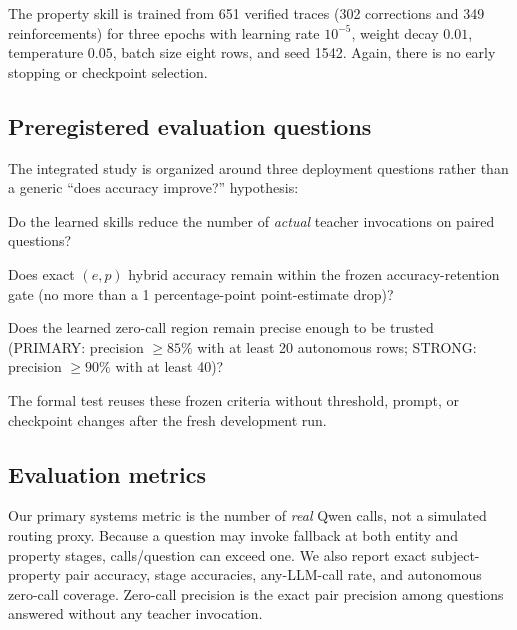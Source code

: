 \documentclass[10pt]{article}
\begin{document}
The property skill is trained from 651 verified traces (302 corrections and 349 reinforcements) for three epochs with learning rate $10^{-5}$, weight decay $0.01$, temperature $0.05$, batch size eight rows, and seed 1542. Again, there is no early stopping or checkpoint selection.


\subsection{Preregistered evaluation questions}
The integrated study is organized around three deployment questions rather than
a generic ``does accuracy improve?'' hypothesis:
\begin{description}[leftmargin=1.4cm,style=nextline]
    \item[RQ1.] Do the learned skills reduce the number of \emph{actual} teacher
    invocations on paired questions?
    \item[RQ2.] Does exact $(e,p)$ hybrid accuracy remain within the frozen
    accuracy-retention gate (no more than a 1 percentage-point point-estimate drop)?
    \item[RQ3.] Does the learned zero-call region remain precise enough to be
    trusted (PRIMARY: precision $\geq85\%$ with at least 20 autonomous rows;
    STRONG: precision $\geq90\%$ with at least 40)?
\end{description}
The formal test reuses these frozen criteria without threshold, prompt, or
checkpoint changes after the fresh development run.

\subsection{Evaluation metrics}
Our primary systems metric is the number of \emph{real} Qwen calls, not a simulated routing proxy. Because a question may invoke fallback at both entity and property stages, calls/question can exceed one. We also report exact subject-property pair accuracy, stage accuracies, any-LLM-call rate, and autonomous zero-call coverage. Zero-call precision is the exact pair precision among questions answered without any teacher invocation.
\end{document}
